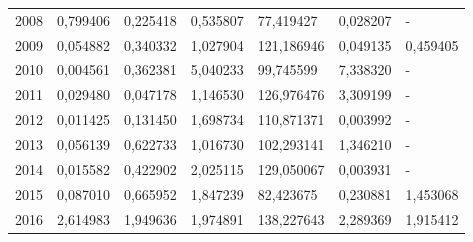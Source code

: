 \begin{table}
\begin{tabular}{p{1cm}p{2cm}p{2cm}p{2cm}p{2cm}p{2cm}p{2cm}}
 2008 &                                   0,799406 &                  0,225418 &                                    0,535807 &                      77,419427 &                                    0,028207 &                 - \\
 2009 &                                   0,054882 &                  0,340332 &                                    1,027904 &                     121,186946 &                                    0,049135 &          0,459405 \\
 2010 &                                   0,004561 &                  0,362381 &                                    5,040233 &                      99,745599 &                                    7,338320 &                 - \\
 2011 &                                   0,029480 &                  0,047178 &                                    1,146530 &                     126,976476 &                                    3,309199 &                 - \\
 2012 &                                   0,011425 &                  0,131450 &                                    1,698734 &                     110,871371 &                                    0,003992 &                 - \\
 2013 &                                   0,056139 &                  0,622733 &                                    1,016730 &                     102,293141 &                                    1,346210 &                 - \\
 2014 &                                   0,015582 &                  0,422902 &                                    2,025115 &                     129,050067 &                                    0,003931 &                 - \\
 2015 &                                   0,087010 &                  0,665952 &                                    1,847239 &                      82,423675 &                                    0,230881 &          1,453068 \\
 2016 &                                   2,614983 &                  1,949636 &                                    1,974891 &                     138,227643 &                                    2,289369 &          1,915412 \\
\bottomrule
\end{tabular}
\end{table}
